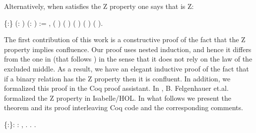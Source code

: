 Alternatively, when  satisfies the Z property one says that  is Z: \begin{coqdoccode}
\coqdocemptyline
\coqdocnoindent
{}  \{:\} (:  ) (:   ) := \coqdockw{\ensuremath{\forall}}  ,     ( )   ( )  ( ) ( ) ( ).\coqdoceol
\coqdocemptyline
\end{coqdoccode}
The first contribution of this work is a constructive proof of the
    fact that the Z property implies confluence. Our proof uses nested
    induction, and hence it differs from the one in \cite{kes09}
    (that follows \cite{ZPropertyDraft}) in the sense that it does
    not rely on the law of the excluded middle. As a result, we have
    an elegant inductive proof of the fact that if a binary relation
    has the Z property then it is confluent. In addition, we
    formalized this proof in the Coq proof assistant. In
    \cite{zproperty}, B. Felgenhauer et.al. formalized the Z
    property in Isabelle/HOL. In what follows we present the theorem
    and its proof interleaving Coq code and the corresponding
    comments. \begin{coqdoccode}
\coqdocemptyline
\coqdocnoindent
{}  \{:\}: \coqdockw{\ensuremath{\forall}} :  ,     .\coqdoceol
\coqdocnoindent
{}.\coqdoceol
\coqdocindent{1.00em}
  . \end{coqdoccode}
